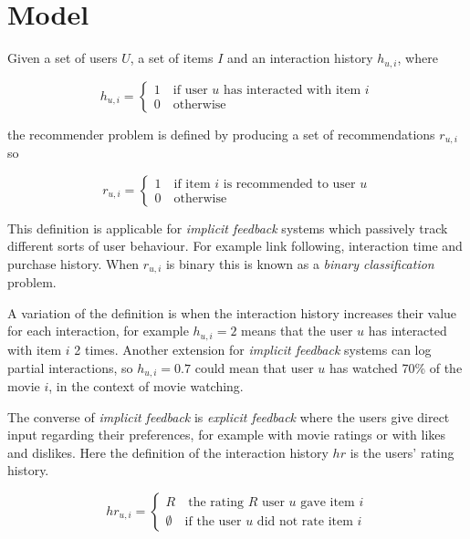 
\section{Model}\label{sec:model}

Given a set of users $U$, a set of items $I$ and an interaction history $h_{u, i}$,  where

\begin{equation}\label{eq:hist}
    h_{u, i} = \begin{cases}
        1 \quad \text{if user $u$ has interacted with item $i$} \\
        0 \quad \text{otherwise}
    \end{cases}
\end{equation}

the recommender problem is defined by producing a set of recommendations $r_{u, i}$ so

\begin{equation}
    r_{u, i} = \begin{cases}
        1 \quad \text{if item $i$ is recommended to user $u$} \\
        0 \quad \text{otherwise}
    \end{cases}
\end{equation}

This definition is applicable for \textit{implicit feedback} systems which passively track different sorts of user behaviour. For example link following, interaction time and purchase history. When $r_{u, i}$ is binary this is known as a \textit{binary classification} problem.

A variation of the definition is when the interaction history increases their value for each interaction, for example $h_{u, i} = 2$ means that the user $u$ has interacted with item $i$ 2 times. Another extension for \textit{implicit feedback} systems can log partial interactions, so $h_{u, i} = 0.7$ could mean that user $u$ has watched 70\% of the movie $i$, in the context of movie watching. \citep{hu2008collaborative}

The converse of \textit{implicit feedback} is \textit{explicit feedback} where the users give direct input regarding their preferences, for example with movie ratings or with likes and dislikes.  Here the definition of the interaction history $hr$ is the users' rating history.

\begin{equation}
    hr_{u, i} = \begin{cases}
        R \quad \text{the rating $R$ user $u$ gave item $i$} \\
        \emptyset \quad \text{if the user $u$ did not rate item $i$}
    \end{cases}
\end{equation}

